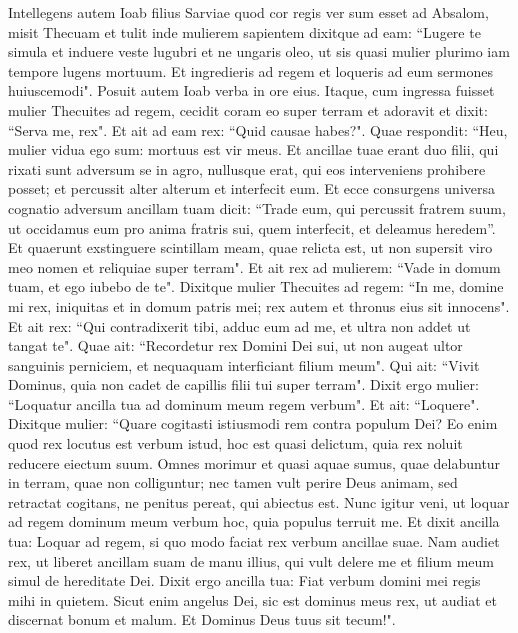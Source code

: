 \begin{biblechapter}  
\verse Intellegens autem Ioab filius Sarviae quod cor regis ver sum esset ad Absalom, 
\verse misit Thecuam et tulit inde mulierem sapientem dixitque ad eam: “Lugere te simula et induere veste lugubri et ne ungaris oleo, ut sis quasi mulier plurimo iam tempore lugens mortuum. 
\verse Et ingredieris ad regem et loqueris ad eum sermones huiuscemodi". Posuit autem Ioab verba in ore eius. 
\verse Itaque, cum ingressa fuisset mulier Thecuites ad regem, cecidit coram eo super terram et adoravit et dixit: “Serva me, rex". 
\verse Et ait ad eam rex: “Quid causae habes?". Quae respondit: “Heu, mulier vidua ego sum: mortuus est vir meus. 
\verse Et ancillae tuae erant duo filii, qui rixati sunt adversum se in agro, nullusque erat, qui eos interveniens prohibere posset; et percussit alter alterum et interfecit eum. 
\verse Et ecce consurgens universa cognatio adversum ancillam tuam dicit: “Trade eum, qui percussit fratrem suum, ut occidamus eum pro anima fratris sui, quem interfecit, et deleamus heredem”. Et quaerunt exstinguere scintillam meam, quae relicta est, ut non supersit viro meo nomen et reliquiae super terram". 
\verse Et ait rex ad mulierem: “Vade in domum tuam, et ego iubebo de te". 
\verse Dixitque mulier Thecuites ad regem: “In me, domine mi rex, iniquitas et in domum patris mei; rex autem et thronus eius sit innocens".  
\verse Et ait rex: “Qui contradixerit tibi, adduc eum ad me, et ultra non addet ut tangat te". 
\verse Quae ait: “Recordetur rex Domini Dei sui, ut non augeat ultor sanguinis perniciem, et nequaquam interficiant filium meum". Qui ait: “Vivit Dominus, quia non cadet de capillis filii tui super terram". 
\verse Dixit ergo mulier: “Loquatur ancilla tua ad dominum meum regem verbum". Et ait: “Loquere". 
\verse Dixitque mulier: “Quare cogitasti istiusmodi rem contra populum Dei? Eo enim quod rex locutus est verbum istud, hoc est quasi delictum, quia rex noluit reducere eiectum suum. 
\verse Omnes morimur et quasi aquae sumus, quae delabuntur in terram, quae non colliguntur; nec tamen vult perire Deus animam, sed retractat cogitans, ne penitus pereat, qui abiectus est.  
\verse Nunc igitur veni, ut loquar ad regem dominum meum verbum hoc, quia populus terruit me. Et dixit ancilla tua: Loquar ad regem, si quo modo faciat rex verbum ancillae suae. 
\verse Nam audiet rex, ut liberet ancillam suam de manu illius, qui vult delere me et filium meum simul de hereditate Dei. 
\verse Dixit ergo ancilla tua: Fiat verbum domini mei regis mihi in quietem. Sicut enim angelus Dei, sic est dominus meus rex, ut audiat et discernat bonum et malum. Et Dominus Deus tuus sit tecum!". 

\end{biblechapter}
